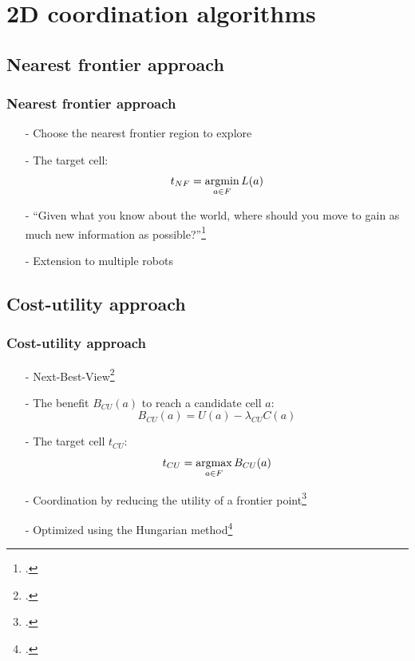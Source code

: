 \section{2D coordination algorithms}

\subsection{Nearest frontier approach}
\begin{frame}
     \frametitle{Nearest frontier approach}
     \begin{itemize}
     	\item[-] Choose the nearest frontier region to explore
     	\item[-] The target cell:
     	\begin{equation}
     	t_{NF} = \operatorname*{argmin}_{a \in F} L(a)
     	\label{equation:t-nf}
     	\end{equation}	
     	\item[-] “Given what you know about the world, where should you move to gain as much new	information as possible?”\footcite{Yamauchi1998} 
     	\item[-] Extension to multiple robots
     \end{itemize}
     
\end{frame}

\subsection{Cost-utility approach}
\begin{frame}
	\frametitle{Cost-utility approach}
	\begin{itemize}
		\item[-] Next-Best-View\footcite{GonzlezBaos2002} 
		\item[-] The benefit $B_{CU}(a)$ to reach a candidate cell $a$:
		\begin{equation}
		B_{CU}(a) = U(a) - \lambda_{CU}C(a)
		\label{equation:cost-utility}
		\end{equation}
		\item[-] The target cell $t_{CU}$:
		\begin{equation}
		t_{CU} = \operatorname*{argmax}_{a \in F} B_{CU}(a)
		\end{equation}
		\item[-] Coordination by reducing the utility of a frontier point\footcite{Burgard2000}
		\item[-] Optimized using the Hungarian method\footcite{Burgard2005}
	\end{itemize}
	
\end{frame}

